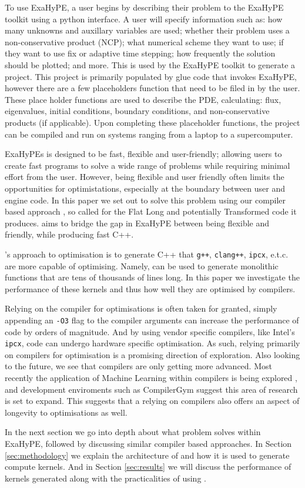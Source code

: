 To use ExaHyPE, a user begins by describing their problem to the ExaHyPE toolkit using a python interface.
A user will specify information such as: how many unknowns and auxillary variables are used; whether their problem uses a non-conservative product (NCP); what numerical scheme they want to use; if they want to use fix or adaptive time stepping; how frequently the solution should be plotted; and more.
This is used by the ExaHyPE toolkit to generate a project.
This project is primarily populated by glue code that invokes ExaHyPE, however there are a few placeholders function that need to be filed in by the user.
These place holder functions are used to describe the PDE, calculating: flux, eigenvalues, initial conditions, boundary conditions, and non-conservative products (if applicable).
Upon completing these placeholder functions, the project can be compiled and run on systems ranging from a laptop to a supercomputer.

ExaHyPEs is designed to be fast, flexible and user-friendly; allowing users to create fast programs to solve a wide range of problems while requiring minimal effort from the user.
However, being flexible and user friendly often limits the opportunities for optimistations, especially at the boundary between user and engine code.
In this paper we set out to solve this problem using our compiler based approach \phlat, so called for the Flat Long and potentially Transformed code it produces.
\phlat aims to bridge the gap in ExaHyPE between being flexible and friendly, while producing fast C++.  

\phlat{}'s approach to optimisation is to generate C++ that \texttt{g++}, \texttt{clang++}, \texttt{ipcx}, e.t.c. are more capable of optimising.  
Namely, \phlat can be used to generate monolithic functions that are tens of thousands of lines long.
In this paper we investigate the performance of these kernels and thus how well they are optimised by compilers.

Relying on the compiler for optimisations is often taken for granted, simply appending an \texttt{-O3} flag to the compiler arguments can increase the performance of code by orders of magnitude.
And by using vendor specific compilers, like Intel's \texttt{ipcx}, code can undergo hardware specific optimisation.
As such, relying primarily on compilers for optimisation is a promising direction of exploration.
Also looking to the future, we see that compilers are only getting more advanced.
Most recently the application of Machine Learning within compilers is being explored \cite{compiler-ml-opt,lots-of-compiler-options}, and development enviroments such as CompilerGym \cite{compiler-gym} suggest this area of research is set to expand.
This suggests that a relying on compilers also offers an aspect of longevity to optimisations as well.

In the next section we go into depth about what problem \phlat solves within ExaHyPE, followed by discussing similar compiler based approaches.
In Section \ref{sec:methodology} we explain the architecture of \phlat and how it is used to generate compute kernels.
And in Section \ref{sec:results} we will discuss the performance of kernels generated along with the practicalities of using \phlat.